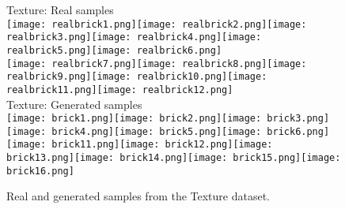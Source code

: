 \begin{figure}
	\centering
	Texture: Real samples\\
	\texttt{[image: realbrick1.png]}\hspace{5px}\texttt{[image: realbrick2.png]}\hspace{5px}\texttt{[image: realbrick3.png]}\hspace{5px}\texttt{[image: realbrick4.png]}\hspace{5px}\texttt{[image: realbrick5.png]}\hspace{5px}\texttt{[image: realbrick6.png]}\\
	\vspace{0.1cm}
	\texttt{[image: realbrick7.png]}\hspace{5px}\texttt{[image: realbrick8.png]}\hspace{5px}\texttt{[image: realbrick9.png]}\hspace{5px}\texttt{[image: realbrick10.png]}\hspace{5px}\texttt{[image: realbrick11.png]}\hspace{5px}\texttt{[image: realbrick12.png]}\\
	
	Texture: Generated samples\\
	\texttt{[image: brick1.png]}\hspace{5px}\texttt{[image: brick2.png]}\hspace{5px}\texttt{[image: brick3.png]}\hspace{5px}\texttt{[image: brick4.png]}\hspace{5px}\texttt{[image: brick5.png]}\hspace{5px}\texttt{[image: brick6.png]}\\
	\vspace{0.1cm}
	\texttt{[image: brick11.png]}\hspace{5px}\texttt{[image: brick12.png]}\hspace{5px}\texttt{[image: brick13.png]}\hspace{5px}\texttt{[image: brick14.png]}\hspace{5px}\texttt{[image: brick15.png]}\hspace{5px}\texttt{[image: brick16.png]}\\
	
	\caption{Real and generated samples from the Texture dataset.}
	\label{fig:samples_texture}
\end{figure}
